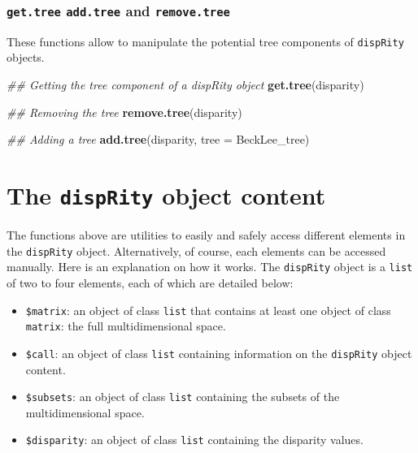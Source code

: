 \documentclass[
]{book}
\newenvironment{Shaded}{\begin{snugshade}}{\end{snugshade}}
\newcommand{\CommentTok}[1]{\textcolor[rgb]{0.56,0.35,0.01}{\textit{#1}}}
\newcommand{\DataTypeTok}[1]{\textcolor[rgb]{0.13,0.29,0.53}{#1}}
\newcommand{\KeywordTok}[1]{\textcolor[rgb]{0.13,0.29,0.53}{\textbf{#1}}}
\newcommand{\NormalTok}[1]{#1}
\providecommand{\tightlist}{%
  \setlength{\itemsep}{0pt}\setlength{\parskip}{0pt}}
\begin{document}
\hypertarget{get.tree-add.tree-and-remove.tree}{%
\subsubsection{\texorpdfstring{\texttt{get.tree} \texttt{add.tree} and \texttt{remove.tree}}{get.tree add.tree and remove.tree}}\label{get.tree-add.tree-and-remove.tree}}

These functions allow to manipulate the potential tree components of \texttt{dispRity} objects.

\begin{Shaded}
\begin{Highlighting}[]
\CommentTok{\#\# Getting the tree component of a dispRity object}
\KeywordTok{get.tree}\NormalTok{(disparity)}

\CommentTok{\#\# Removing the tree}
\KeywordTok{remove.tree}\NormalTok{(disparity)}

\CommentTok{\#\# Adding a tree}
\KeywordTok{add.tree}\NormalTok{(disparity, }\DataTypeTok{tree =}\NormalTok{ BeckLee\_tree)}
\end{Highlighting}
\end{Shaded}

\hypertarget{disprity-object}{%
\section{\texorpdfstring{The \texttt{dispRity} object content}{The dispRity object content}}\label{disprity-object}}

The functions above are utilities to easily and safely access different elements in the \texttt{dispRity} object.
Alternatively, of course, each elements can be accessed manually.
Here is an explanation on how it works.
The \texttt{dispRity} object is a \texttt{list} of two to four elements, each of which are detailed below:

\begin{itemize}
\tightlist
\item
  \texttt{\$matrix}: an object of class \texttt{list} that contains at least one object of class \texttt{matrix}: the full multidimensional space.
\item
  \texttt{\$call}: an object of class \texttt{list} containing information on the \texttt{dispRity} object content.
\item
  \texttt{\$subsets}: an object of class \texttt{list} containing the subsets of the multidimensional space.
\item
  \texttt{\$disparity}: an object of class \texttt{list} containing the disparity values.
\end{itemize}
\end{document}
